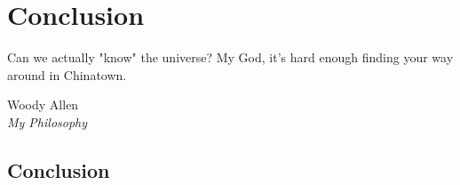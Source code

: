 \chapter{Conclusion}
\label{chap:conclusion}

\epigraph{\foreignlanguage{USenglish}{Can we actually "know" the
    universe? My God, it's hard enough finding your way around in
    Chinatown.}}{Woody Allen\\\emph{My Philosophy}}
\clearpage

\section{Conclusion}
